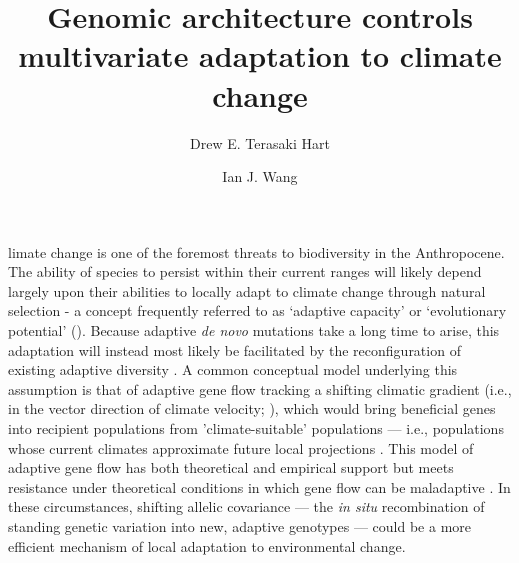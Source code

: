\documentclass[9pt,twocolumn,twoside,lineno]{pnas-new}
\title{Genomic architecture controls multivariate adaptation to climate change}
\author[a,1]{Drew E. Terasaki Hart}
\author[a]{Ian J. Wang}
\affil[a]{Department of Environmental Science, Policy, and Management, University of California, Berkeley, CA 94720}
\begin{document}
\maketitle
\thispagestyle{firststyle}


limate change is one of the foremost threats to biodiversity in the Anthropocene.
The ability of species to persist within their current ranges will likely depend largely upon their abilities to
locally adapt to climate change through natural selection - a concept frequently referred to 
as `adaptive capacity’ or `evolutionary potential’ (\cite{chevin,harrisson,nicotra,vilas,wade}).
Because adaptive \textit{de novo} mutations take a long time to arise,
this adaptation will instead most likely be facilitated
by the reconfiguration of existing adaptive diversity \cite{bomblies}.
A common conceptual model underlying this assumption is that of
adaptive gene flow tracking a shifting climatic gradient
(i.e., in the vector
direction of climate velocity; \cite{loarie,ackerly}),
which would bring beneficial genes into recipient populations
from 'climate-suitable' populations --- i.e., populations whose
current climates approximate future local projections \cite{bellis}.
This model of adaptive gene flow has both theoretical
\cite{aitken_whitlock,slatkin,tigano}
and empirical 
\cite{feder,bell}
support
but meets resistance under theoretical conditions in which gene flow can be maladaptive
\cite{wang,lenormand,slatkin,haldane,wright,felsenstein}.
In these circumstances, shifting allelic covariance --- 
 the \textit{in situ} recombination of standing genetic variation into new,
adaptive genotypes --- could be a more efficient mechanism of local adaptation to environmental change.
\end{document}
